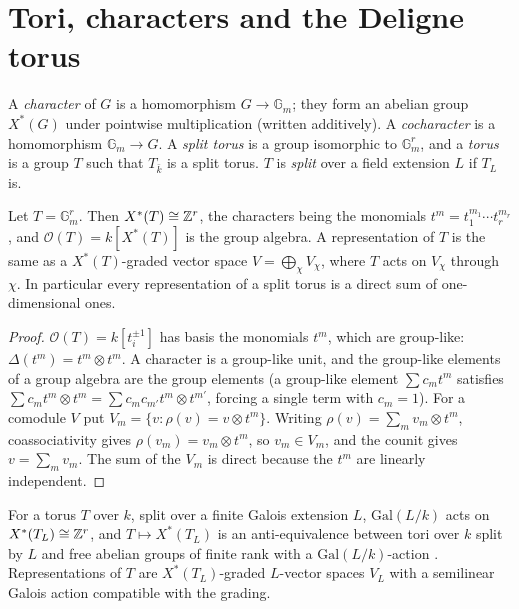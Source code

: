 \section{Tori, characters and the Deligne torus}\label{algebraic-groups:section-tori}

\begin{definition}\label{algebraic-groups:definition-torus}
A \emph{character} of $G$ is a homomorphism $G \to \mathbb{G}_m$; they form an abelian group $X^*(G)$ under pointwise multiplication (written additively). A
\emph{cocharacter} is a homomorphism $\mathbb{G}_m \to G$. A \emph{split torus} is a group isomorphic to $\mathbb{G}_m^r$, and a \emph{torus} is a group $T$ such that $T_{\bar k}$ is a split
torus. $T$ is \emph{split} over a field extension $L$ if $T_L$ is.
\end{definition}

\begin{proposition}\label{algebraic-groups:proposition-torus-reps}
Let $T = \mathbb{G}_m^r$. Then $X^*(T) \cong \mathbb{Z}^r$, the characters being the monomials $t^m = t_1^{m_1} \cdots t_r^{m_r}$, and $\mathcal{O}(T) = k[X^*(T)]$ is the group algebra. A
representation of $T$ is the same as a $X^*(T)$-graded vector space $V = \bigoplus_\chi V_\chi$, where $T$ acts on $V_\chi$ through $\chi$. In particular every representation of a
split torus is a direct sum of one-dimensional ones.
\end{proposition}

\begin{proof}
$\mathcal{O}(T) = k[t_i^{\pm 1}]$ has basis the monomials $t^m$, which are group-like: $\Delta(t^m) = t^m \otimes t^m$. A character is a group-like unit, and the group-like elements of a
group algebra are the group elements (a group-like element $\sum c_mt^m$ satisfies $\sum c_mt^m \otimes t^m = \sum c_mc_{m'}t^m \otimes t^{m'}$, forcing a single term with $c_m = 1$). For a
comodule $V$ put $V_m = \{v : \rho(v) = v \otimes t^m\}$. Writing $\rho(v) = \sum_mv_m \otimes t^m$, coassociativity gives $\rho(v_m) = v_m \otimes t^m$, so $v_m \in V_m$, and the counit gives
$v = \sum_mv_m$. The sum of the $V_m$ is direct because the $t^m$ are linearly independent.
\end{proof}

\begin{remark}\label{algebraic-groups:remark-galois-tori}
For a torus $T$ over $k$, split over a finite Galois extension $L$, $\mathrm{Gal}(L/k)$ acts on $X^*(T_L) \cong \mathbb{Z}^r$, and $T \mapsto X^*(T_L)$ is an anti-equivalence between tori
over $k$ split by $L$ and free abelian groups of finite rank with a $\mathrm{Gal}(L/k)$-action \cite{milne-algebraic-groups}. Representations of $T$ are
$X^*(T_L)$-graded $L$-vector spaces $V_L$ with a semilinear Galois action compatible with the grading.
\end{remark}

